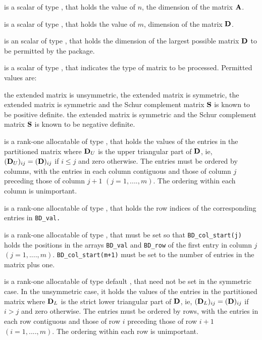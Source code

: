 \documentclass{galahad}
\begin{document}
\begin{description}

 is a scalar of type \integer, that holds the value of 
$n$, the dimension of the matrix $ {\mathbf{A}}$. 
 
 is a scalar of type \integer, that holds the value of  
$m$, dimension of the matrix ${\mathbf{D}}$. 
 
 is an scalar of type \integer,
that holds the dimension of the largest possible matrix ${\mathbf{D}}$ to be permitted
by the package. 

 is a scalar of type \integer,
that indicates the type of matrix to be processed. Permitted values are: 

\begin{description} 
 the extended matrix is unsymmetric, 
 the extended matrix is symmetric, 
 the extended matrix is symmetric and the Schur complement matrix 
${\mathbf{S}}$ is known to be positive definite. 
 the extended matrix is symmetric and the Schur complement matrix 
${\mathbf{S}}$ is known to be negative definite. 
\end{description} 

 is a rank-one allocatable of  
type \realdp, 
that holds the values of the entries in the partitioned matrix 
where ${\mathbf{D}}_U$ is the upper triangular part of ${\mathbf{D}}$, ie, 
$( {\mathbf{D}}_U )_{ij}  =  ( {\mathbf{D}} )_{ij} $ if $i  \leq  j$ and zero otherwise. 
The entries must be ordered by columns, with the entries in each column 
contiguous and those of column 
$j$ preceding those of column $j+1$ $(j = 1, ...., m)$. The ordering 
within each column is unimportant. 
 
 is a rank-one allocatable of type \integer, that holds 
the row indices of the corresponding entries in {\tt BD\_val.} 
 
 is a rank-one allocatable of type \integer, that  
must be set so that {\tt BD\_col\_start(j)} holds the positions 
in the arrays {\tt BD\_val} and {\tt BD\_row} of the first entry in column $j$ 
$(j = 1, ...., m)$. {\tt BD\_col\_start(m+1)} must be set to 
the number of entries in the matrix  plus one. 
 
 is a rank-one allocatable of type default  
\realdp, that need not be 
set in the symmetric case. In the unsymmetric case, it 
holds the values of the entries in the partitioned matrix 
where ${\mathbf{D}}_L$ is the strict lower triangular part of ${\mathbf{D}}$, ie, 
$( {\mathbf{D}}_L )_{ij}  =  ( {\mathbf{D}} )_{ij} $ if $i  >  j$ and zero 
otherwise. 
The entries must be ordered by rows, with the entries in each row 
contiguous and those of row 
$i$ preceding those of row $i+1$ $(i = 1, ...., m)$. 
The ordering within each row is unimportant. 
 

\end{description}
\end{document}
